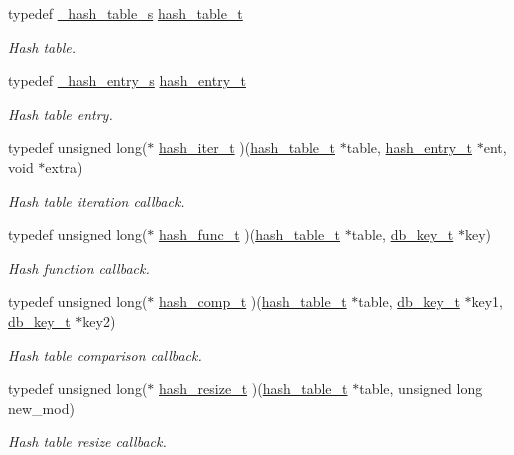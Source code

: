 \begin{CompactItemize}
\item 
typedef \hyperlink{struct__hash__table__s}{\_\-hash\_\-table\_\-s} \hyperlink{group__dbprim__hash_ga1}{hash\_\-table\_\-t}
\begin{CompactList}\small\item\em Hash table. \item\end{CompactList}\item 
typedef \hyperlink{struct__hash__entry__s}{\_\-hash\_\-entry\_\-s} \hyperlink{group__dbprim__hash_ga2}{hash\_\-entry\_\-t}
\begin{CompactList}\small\item\em Hash table entry. \item\end{CompactList}\item 
typedef unsigned long($\ast$ \hyperlink{group__dbprim__hash_ga3}{hash\_\-iter\_\-t} )(\hyperlink{struct__hash__table__s}{hash\_\-table\_\-t} $\ast$table, \hyperlink{struct__hash__entry__s}{hash\_\-entry\_\-t} $\ast$ent, void $\ast$extra)
\begin{CompactList}\small\item\em Hash table iteration callback. \item\end{CompactList}\item 
typedef unsigned long($\ast$ \hyperlink{group__dbprim__hash_ga4}{hash\_\-func\_\-t} )(\hyperlink{struct__hash__table__s}{hash\_\-table\_\-t} $\ast$table, \hyperlink{struct__db__key__s}{db\_\-key\_\-t} $\ast$key)
\begin{CompactList}\small\item\em Hash function callback. \item\end{CompactList}\item 
typedef unsigned long($\ast$ \hyperlink{group__dbprim__hash_ga5}{hash\_\-comp\_\-t} )(\hyperlink{struct__hash__table__s}{hash\_\-table\_\-t} $\ast$table, \hyperlink{struct__db__key__s}{db\_\-key\_\-t} $\ast$key1, \hyperlink{struct__db__key__s}{db\_\-key\_\-t} $\ast$key2)
\begin{CompactList}\small\item\em Hash table comparison callback. \item\end{CompactList}\item 
typedef unsigned long($\ast$ \hyperlink{group__dbprim__hash_ga6}{hash\_\-resize\_\-t} )(\hyperlink{struct__hash__table__s}{hash\_\-table\_\-t} $\ast$table, unsigned long new\_\-mod)
\begin{CompactList}\small\item\em Hash table resize callback. \item\end{CompactList}\end{CompactItemize}
